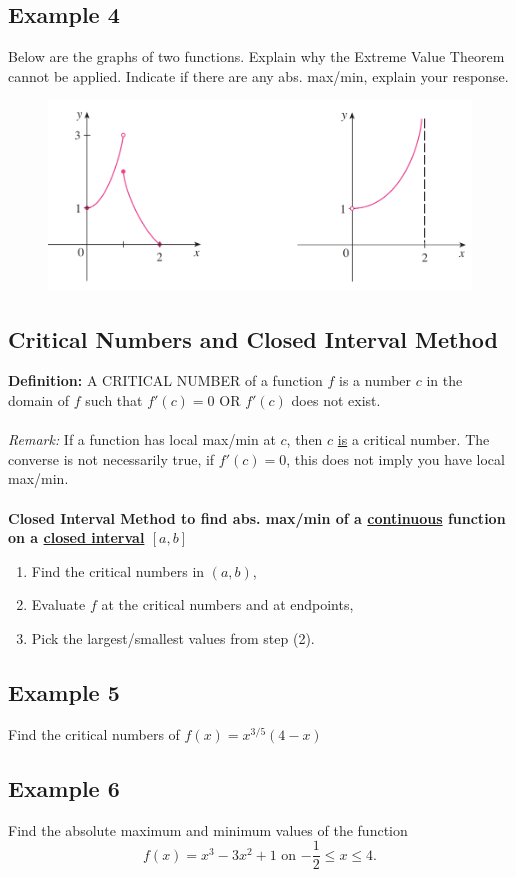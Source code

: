 \documentclass[10pt]{book}
\theoremstyle{definition}
\begin{document}
\subsection*{Example 4} Below are the graphs of two functions. Explain why the Extreme Value Theorem cannot be applied. Indicate if there are any abs. max/min, explain your response.
\begin{figure}[h]
    \centering
    \includegraphics{Graph_6.png}
\end{figure}
\clearpage
\begin{tcolorbox}
\subsection*{Critical Numbers and Closed Interval Method}
\textbf{Definition:} A CRITICAL NUMBER of a function $f$ is a number $c$ in the domain of $f$ such that $f'(c)=0$ OR $f'(c)$ does not exist.\\ \\
\textit{Remark:} If a function has local max/min at $c$, then $c$ \underline{is} a critical number. The converse is not necessarily true, if $f'(c)=0$, this does not imply you have local max/min.\\ \\
\textbf{Closed Interval Method to find abs. max/min of a \underline{continuous} function on a \underline{closed interval} $[a,b]$}
\begin{enumerate}
    \item Find the critical numbers in $(a,b)$,
    \item Evaluate $f$ at the critical numbers and at endpoints,
    \item Pick the largest/smallest values from step (2).
\end{enumerate}
\end{tcolorbox}
\subsection*{Example 5} Find the critical numbers of $f(x)=x^{3/5}(4-x)$\vspace{5cm}
\subsection*{Example 6} Find the absolute maximum and minimum values of the function 
\[
f(x)=x^3-3x^2+1\textrm{ on $-\frac{1}{2}\leq x\leq 4$.}
\]
\end{document}
